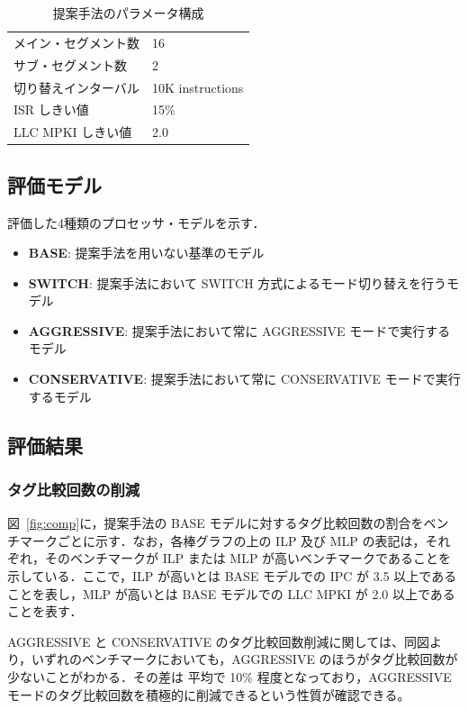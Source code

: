 \documentclass[submit,techrep,noauthor]{ipsj}
\newcommand{\fig}[1]{{図~\ref{fig:#1}}}
\begin{document}
\begin{table}[htb]
  \caption{提案手法のパラメータ構成}
  \footnotesize
  \center
    \begin{tabular}{l|l} \hline \hline
    メイン・セグメント数 & 16 \\
    サブ・セグメント数 & 2 \\
    切り替えインターバル & 10K instructions \\
    ISR しきい値 & 15\% \\
    LLC MPKI しきい値 & 2.0 \\ \hline 
  \end{tabular}
  \label{tab:segmentedIQ_config}
\end{table}

\subsection{評価モデル}
評価した4種類のプロセッサ・モデルを示す．
\begin{itemize}
  \item \textbf{BASE}: 提案手法を用いない基準のモデル
  \item \textbf{SWITCH}: 提案手法において SWITCH 方式によるモード切り替えを行うモデル
  \item \textbf{AGGRESSIVE}: 提案手法において常に AGGRESSIVE モードで実行するモデル
  \item \textbf{CONSERVATIVE}: 提案手法において常に CONSERVATIVE モードで実行するモデル
\end{itemize}

\subsection{評価結果}
\subsubsection{タグ比較回数の削減}
\fig{comp}に，提案手法の BASE モデルに対するタグ比較回数の割合をベンチマークごとに示す．なお，各棒グラフの上の ILP 及び MLP の表記は，それぞれ，そのベンチマークが ILP または MLP が高いベンチマークであることを示している．ここで，ILP が高いとは BASE モデルでの IPC が 3.5 以上であることを表し，MLP が高いとは BASE モデルでの LLC MPKI が 2.0 以上であることを表す． 

AGGRESSIVE と CONSERVATIVE のタグ比較回数削減に関しては、同図より，いずれのベンチマークにおいても，AGGRESSIVE のほうがタグ比較回数が少ないことがわかる．その差は 平均で 10\% 程度となっており，AGGRESSIVE モードのタグ比較回数を積極的に削減できるという性質が確認できる。
\end{document}

